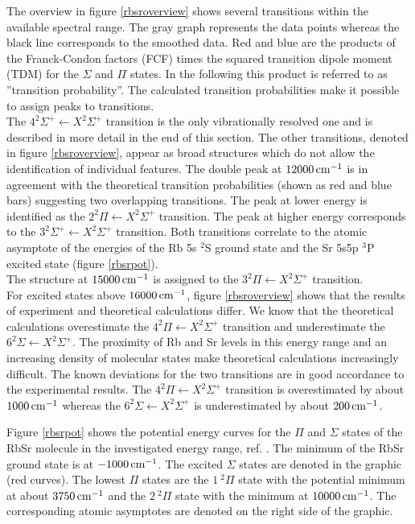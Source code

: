 \documentclass[parskip,12pt,headsepline,a4paper] {scrbook}
\begin{document}
The overview in figure \ref{rbsroverview} shows several transitions within the available spectral range. The gray graph represents the data points whereas the black line corresponds to the smoothed data. Red and blue are the products of the Franck-Condon factors (FCF) times the squared transition dipole moment (TDM) for the $\Sigma$ and $\Pi$ states. In the following this product is referred to as ''transition probability''. The calculated transition probabilities make it possible to assign peaks to transitions. \\
The $4 ^2\Sigma^+ \leftarrow X ^2\Sigma^+$ transition is the only vibrationally resolved one and is described in more detail in the end of this section. The other transitions, denoted in figure \ref{rbsroverview}, appear as broad structures which do not allow the identification of individual features. The double peak at $\unit[12000]{cm^{-1}}$ is in agreement with the theoretical transition probabilities (shown as red and blue bars) suggesting two overlapping transitions. The peak at lower energy is identified as the $2 ^2\Pi \leftarrow X ^2\Sigma^+$ transition. The peak at higher energy corresponds to the $3 ^2\Sigma^+ \leftarrow X ^2\Sigma^+$ transition. Both transitions correlate to the atomic asymptote of the energies of the Rb 5s $^2$S ground state and the Sr 5s5p $^3$P excited state (figure \ref{rbsrpot}). \\
The structure at $\unit[15000]{cm^{-1}}$ is assigned to the $3 ^2\Pi \leftarrow X ^2\Sigma^+$ transition. \\
For excited states above $\unit[16000]{cm^{-1}}$, figure \ref{rbsroverview} shows that the results of experiment and theoretical calculations differ. We know that the theoretical calculations overestimate the $4 ^2\Pi \leftarrow X ^2\Sigma^+$ transition and underestimate the $6 ^2\Sigma \leftarrow X ^2\Sigma^+$. The proximity of Rb and Sr levels in this energy range and an increasing density of molecular states make theoretical calculations increasingly difficult. The known deviations for the two transitions are in good accordance to the experimental results. The $4 ^2\Pi \leftarrow X ^2\Sigma^+$ transition is overestimated by about $\unit[1000]{cm^{-1}}$ whereas the $6 ^2\Sigma \leftarrow X ^2\Sigma^+$ is underestimated by about $\unit[200]{cm^{-1}}$.

Figure \ref{rbsrpot} shows the potential energy curves for the $\Pi$ and $\Sigma$ states of the RbSr molecule in the investigated energy range, ref. \cite{krois-doc}. The minimum of the RbSr ground state is at $\unit[-1000]{cm^{-1}}$. The excited $\Sigma$ states are denoted in the graphic (red curves). The lowest $\Pi$ states are the $1 \ ^2\Pi$ state with the potential minimum at about $\unit[3750]{cm^{-1}}$ and the $2 \ ^2\Pi$ state with the minimum at $\unit[10000]{cm^{-1}}$. The corresponding atomic asymptotes are denoted on the right side of the graphic.
\end{document}
